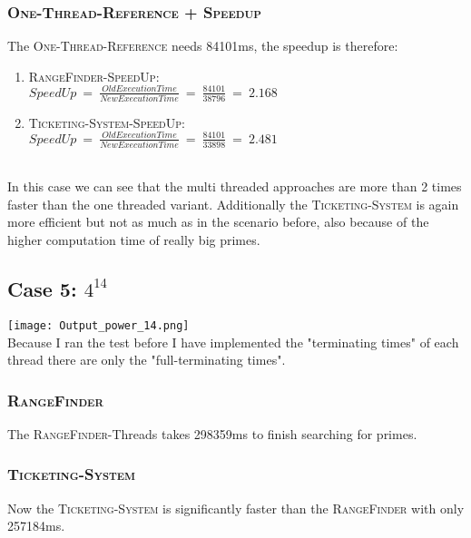 \documentclass{article}
\begin{document}
\begin{adjustwidth}{2em}{2em}
\begin{adjustwidth}{2em}{2em}
			\subsubsection*{\textsc{One-Thread-Reference + Speedup}}
			\begin{adjustwidth}{1em}{}
				The \textsc{One-Thread-Reference} needs 84101ms, the speedup is therefore: \\
				\begin{enumerate}[]
					\item \textsc{RangeFinder-SpeedUp}: \\
					$\textit{SpeedUp} \ = \ \frac{\textit{OldExecutionTime}}{\textit{NewExecutionTime}} \ = \ \frac{84101}{38796} \ = \ 2.168$
					\item \textsc{Ticketing-System-SpeedUp}: \\
					$\textit{SpeedUp} \ = \ \frac{\textit{OldExecutionTime}}{\textit{NewExecutionTime}} \ = \ \frac{84101}{33898} \ = \ 2.481$
				\end{enumerate}
				\hfill \\
				In this case we can see that the multi threaded approaches are more than 2 times faster than the one threaded variant. Additionally the \textsc{Ticketing-System} is again more efficient but not as much as in the scenario before, also because of the higher computation time of really big primes.
			\end{adjustwidth}
		\end{adjustwidth}
		
		\newpage
		
		\subsection*{Case 5: $4^{14}$}
		\begin{adjustwidth}{2em}{2em}
			\texttt{[image: Output\_power\_14.png]} \\
			Because I ran the test before I have implemented the "terminating times" of each thread there are only the "full-terminating times".
			\subsubsection*{\textsc{RangeFinder}}
			\begin{adjustwidth}{1em}{}
				The \textsc{RangeFinder}-Threads takes 298359ms to finish searching for primes.
			\end{adjustwidth}
			\subsubsection*{\textsc{Ticketing-System}}
			\begin{adjustwidth}{1em}{}
				Now the \textsc{Ticketing-System} is significantly faster than the \textsc{RangeFinder} with only 257184ms.
			\end{adjustwidth}

\end{adjustwidth}
\end{adjustwidth}
\end{document}
